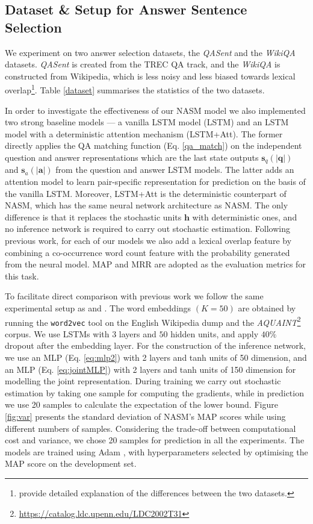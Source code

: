 \documentclass{article}
\newcommand{\tmmathbf}[1]{\ensuremath{\boldsymbol{#1}}}
\begin{document}
\subsection{Dataset \& Setup for Answer Sentence Selection}

We experiment on two answer selection datasets, the \textit{QASent} and the \textit{WikiQA} datasets. 
\textit{QASent} \citep{wang2007jeopardy} is created from the TREC QA track, and the \textit{WikiQA} \citep{yang-yih-meek:2015:EMNLP} is constructed from Wikipedia, which is less noisy and less biased towards lexical overlap\footnote{\citet{yang-yih-meek:2015:EMNLP} provide detailed explanation of the differences between the two datasets.}. Table \ref{dataset} summarises the statistics of the two datasets.

In order to investigate the effectiveness of our NASM model we also implemented two strong baseline models --- a vanilla LSTM model (LSTM) and an LSTM model with a deterministic attention mechanism (LSTM+Att). 
The former directly applies the QA matching function (Eq. \ref{qa_match}) on the independent question and answer representations which are the last state outputs $\tmmathbf{s}_q (| \tmmathbf{q} |)$ and $\tmmathbf{s}_a (|\tmmathbf{a} |)$ from the question and answer LSTM models. 
The latter adds an attention model to learn pair-specific representation for prediction on the basis of the vanilla LSTM. 
Moreover, LSTM+Att is the deterministic counterpart of NASM, which has the same neural network architecture as NASM. The only difference is that it replaces the stochastic units $\tmmathbf{h}$ with deterministic ones, and no inference network is required to carry out stochastic estimation.
Following previous work, for each of our models we also add a lexical overlap feature by combining a co-occurrence word count feature with the probability generated from the neural model. 
MAP and MRR are adopted as the evaluation metrics for this task.

To facilitate direct comparison with previous work we follow the same experimental setup as \citet{Yu:2014} and \citet{severyn2015disi}. 
The word embeddings $(K = 50)$  are obtained by running the \texttt{word2vec} tool \citep{DBLP:conf/nips/MikolovSCCD13} on the English Wikipedia dump and the \textit{AQUAINT}\footnote{\url{https://catalog.ldc.upenn.edu/LDC2002T31}} corpus. 
We use LSTMs with $3$ layers and $50$ hidden units, and apply $40 \%$ dropout after the embedding layer. 
For the construction of the inference network, we use an MLP (Eq. \ref{eq:mlp2}) with 2 layers and tanh units of 50 dimension, and an MLP (Eq. \ref{eq:jointMLP}) with 2 layers and tanh units of 150 dimension for modelling the joint representation.
During training we carry out stochastic estimation by taking one sample for computing the gradients, while in prediction we use 20 samples to calculate the expectation of the lower bound. 
Figure \ref{fig:var} presents the standard deviation of NASM's MAP scores while using different numbers of samples. 
Considering the trade-off between computational cost and variance, we chose 20 samples for prediction in all the experiments. 
The models are trained using Adam \citep{DBLP:journals/corr/KingmaB14}, with hyperparameters selected by optimising the MAP score on the development set.
\end{document}
